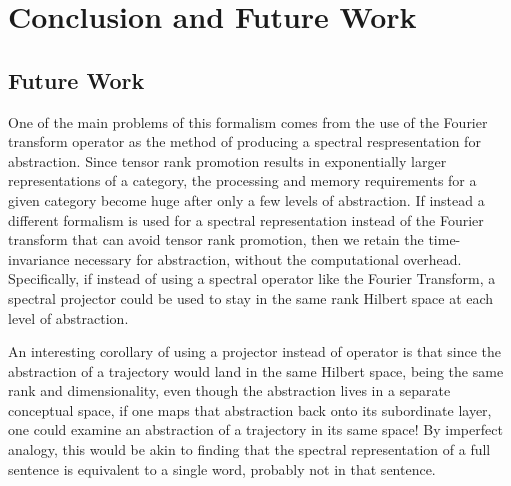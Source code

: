\documentclass[runningheads]{llncs}
\begin{document}

\section{Conclusion and Future Work}


\subsection{Future Work}


One of the main problems of this formalism comes from the use of the Fourier transform operator as the method of producing a spectral respresentation for abstraction.  Since tensor rank promotion results in exponentially larger representations of a category, the processing and memory requirements for a given category become huge after only a few levels of abstraction.  If instead a different formalism is used for a spectral representation instead of the Fourier transform that can avoid tensor rank promotion, then we retain the time-invariance necessary for abstraction, without the computational overhead. Specifically, if instead of using a spectral operator like the Fourier Transform, a spectral projector could be used to stay in the same rank Hilbert space at each level of abstraction.

An interesting corollary of using a projector instead of operator is that since the abstraction of a trajectory would land in the same Hilbert space, being the same rank and dimensionality, even though the abstraction lives in a separate conceptual space, if one maps that abstraction back onto its subordinate layer, one could examine an abstraction of a trajectory in its same space!  By imperfect analogy, this would be akin to finding that the spectral representation of a full sentence is equivalent to a single word, probably not in that sentence.


%
%



%
\end{document}
